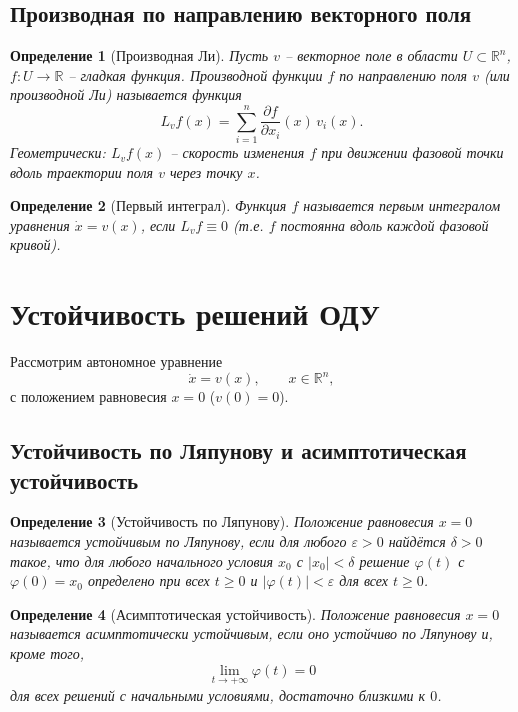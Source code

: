 \documentclass[a4paper,12pt]{article}
\newtheorem{definition}{Определение}
\theoremstyle{definition}
\begin{document}
\subsection{Производная по направлению векторного поля}

\begin{definition}[Производная Ли]
	Пусть $v$ – векторное поле в области $U\subset\mathbb{R}^n$, $f:U\to\mathbb{R}$ – гладкая функция. \emph{Производной функции $f$ по направлению поля $v$} (или производной Ли) называется функция
	\[
	L_v f(x)=\sum_{i=1}^n \frac{\partial f}{\partial x_i}(x)\,v_i(x).
	\]
	Геометрически: $L_v f(x)$ – скорость изменения $f$ при движении фазовой точки вдоль траектории поля $v$ через точку $x$.
\end{definition}

\begin{definition}[Первый интеграл]
	Функция $f$ называется \emph{первым интегралом} уравнения $\dot{x}=v(x)$, если $L_v f\equiv 0$ (т.е. $f$ постоянна вдоль каждой фазовой кривой).
\end{definition}

\section{Устойчивость решений ОДУ}

Рассмотрим автономное уравнение
\[
\dot{x}=v(x),\qquad x\in\mathbb{R}^n,
\]
с положением равновесия $x=0$ ($v(0)=0$).

\subsection{Устойчивость по Ляпунову и асимптотическая устойчивость}

\begin{definition}[Устойчивость по Ляпунову]
	Положение равновесия $x=0$ называется \emph{устойчивым по Ляпунову}, если для любого $\varepsilon>0$ найдётся $\delta>0$ такое, что для любого начального условия $x_0$ с $|x_0|<\delta$ решение $\varphi(t)$ с $\varphi(0)=x_0$ определено при всех $t\ge0$ и $|\varphi(t)|<\varepsilon$ для всех $t\ge0$.
\end{definition}

\begin{definition}[Асимптотическая устойчивость]
	Положение равновесия $x=0$ называется \emph{асимптотически устойчивым}, если оно устойчиво по Ляпунову и, кроме того,
	\[
	\lim_{t\to+\infty}\varphi(t)=0
	\]
	для всех решений с начальными условиями, достаточно близкими к $0$.
\end{definition}
\end{document}
